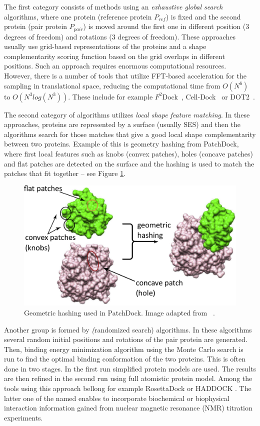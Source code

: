 The first category consists of methods using an \textit{exhaustive global search} algorithms, where one protein (reference protein $P_{ref}$) is fixed and the second protein (pair protein $P_{pair}$) is moved around the first one in different position (3 degrees of freedom) and rotations (3 degrees of freedom). These approaches usually use grid-based representations of the proteins and a shape complementarity scoring function based on the grid overlaps in different positions. Such an approach requires enormous computational resources. However, there is a number of tools that utilize FFT-based acceleration for the sampling in translational space, reducing the computational time from $O (N^6)$ to $O(N^3 log(N^3))$. These include for example $F^2$Dock~\cite{bajaj2011f}, Cell-Dock~\cite{pons2012cell} or DOT2~\cite{roberts2013dot2}.

The second category of algorithms utilizes \textit{local shape feature matching}. In these approaches, proteins are represented by a surface (usually SES) and then the algorithms search for those matches that give a good local shape complementarity between two proteins. Example of this is geometry hashing from PatchDock\cite{schneidman2005patchdock}, where first local features such as knobs (convex patches), holes (concave patches) and flat patches are detected on the surface and the hashing is used to match the patches that fit together -- see Figure \ref{Fig:hashing}.

\begin{figure}[h]
  \begin{center}
  \includegraphics[width=0.6\linewidth]{pictures/geometryhash.pdf}
  \caption{Geometric hashing used in PatchDock. Image adapted from~ \cite{huang2014search}.}
  \label{Fig:hashing}  
 \end{center}  
\end{figure}

Another group is formed by \textit(randomized search) algorithms. In these algorithms several random initial positions and rotations of the pair protein are generated. Then, binding energy minimization algorithm using the Monte Carlo search is run to find the optimal binding conformation of the two proteins. This is often done in two stages. In the first run simplified protein models are used. The results are then refined in the second run using full atomistic protein model. Among the tools using this approach bellong for example RosettaDock \cite{gray2003protein} or HADDOCK \cite{dominguez2003haddock, de2010haddock}. The latter one of the named enables to incorporate biochemical or biophysical interaction information gained from nuclear magnetic resonance (NMR) titration experiments.

